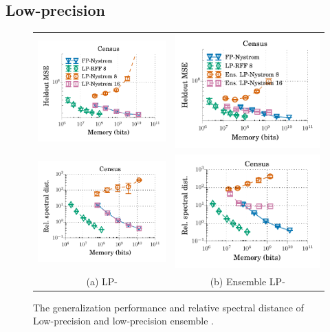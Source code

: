 \subsection{Low-precision \Nystrom}
\label{sec:lpnystrom}
\begin{figure}
\centering
\begin{tabular}{c c}
	\includegraphics[width=0.4\linewidth]{figures/lp_nystrom_mse_vs_mem.pdf} &
	\includegraphics[width=0.4\linewidth]{figures/lp_ensemble_nystrom_mse_vs_mem.pdf} \\
	\includegraphics[width=0.4\linewidth]{figures/lp_nystrom_delta_vs_mem.pdf} &
	\includegraphics[width=0.4\linewidth]{figures/lp_ensemble_nystrom_delta_vs_mem.pdf} \\
	(a) LP-\Nystrom & (b) Ensemble LP-\Nystrom
\end{tabular}
\caption{The generalization performance and relative spectral distance of Low-precision \Nystrom and low-precision ensemble \Nystrom.}	
\end{figure}

